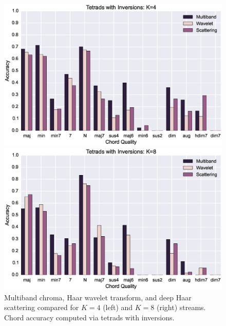 \documentclass{article}
\begin{document}
\begin{figure}[h!]
\centering
\begin{minipage}{\columnwidth}
	\centering
	\includegraphics[width=1.0\columnwidth]{figs/tetrad_inv4.eps}
\end{minipage}
\begin{minipage}{\columnwidth}
	\centering
	\includegraphics[width=1.0\columnwidth]{figs/tetrad_inv8.eps}
\end{minipage}
\caption{Multiband chroma, Haar wavelet transform, and deep Haar scattering compared for $K=4$ (left) and $K=8$ (right) streams. Chord accuracy computed via tetrads with inversions.}
\label{fig:tetrads}
\end{figure}
\end{document}

